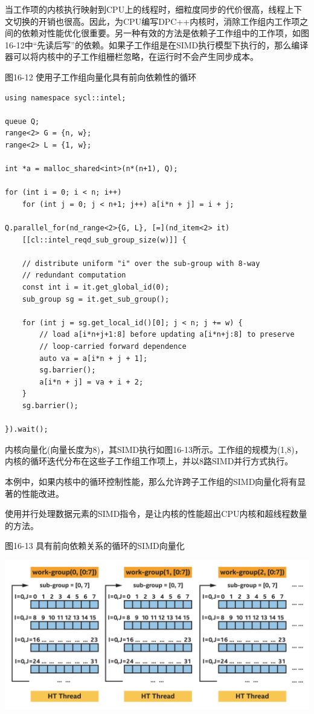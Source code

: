 当工作项的内核执行映射到CPU上的线程时，细粒度同步的代价很高，线程上下文切换的开销也很高。因此，为CPU编写DPC++内核时，消除工作组内工作项之间的依赖对性能优化很重要。另一种有效的方法是依赖子工作组中的工作项，如图16-12中“先读后写”的依赖。如果子工作组是在SIMD执行模型下执行的，那么编译器可以将内核中的子工作组栅栏忽略，在运行时不会产生同步成本。\par

\hspace*{\fill} \par %
图16-12 使用子工作组向量化具有前向依赖性的循环
\begin{lstlisting}[caption={}]
using namespace sycl::intel;

queue Q;
range<2> G = {n, w};
range<2> L = {1, w};

int *a = malloc_shared<int>(n*(n+1), Q);

for (int i = 0; i < n; i++)
	for (int j = 0; j < n+1; j++) a[i*n + j] = i + j;
	
Q.parallel_for(nd_range<2>{G, L}, [=](nd_item<2> it)
	[[cl::intel_reqd_sub_group_size(w)]] {
		
	// distribute uniform "i" over the sub-group with 8-way
	// redundant computation
	const int i = it.get_global_id(0);
	sub_group sg = it.get_sub_group();
	
	for (int j = sg.get_local_id()[0]; j < n; j += w) {
		// load a[i*n+j+1:8] before updating a[i*n+j:8] to preserve
		// loop-carried forward dependence
		auto va = a[i*n + j + 1];
		sg.barrier();
		a[i*n + j] = va + i + 2;
	}
	sg.barrier();
	
}).wait();
\end{lstlisting}

内核向量化(向量长度为8)，其SIMD执行如图16-13所示。工作组的规模为(1,8)，内核的循环迭代分布在这些子工作组工作项上，并以8路SIMD并行方式执行。\par

本例中，如果内核中的循环控制性能，那么允许跨子工作组的SIMD向量化将有显著的性能改进。\par

使用并行处理数据元素的SIMD指令，是让内核的性能超出CPU内核和超线程数量的方法。\par

\hspace*{\fill} \par %
图16-13 具有前向依赖关系的循环的SIMD向量化
\begin{center}
	\includegraphics[width=1.0\textwidth]{content/chapter-16/images/7}
\end{center}

